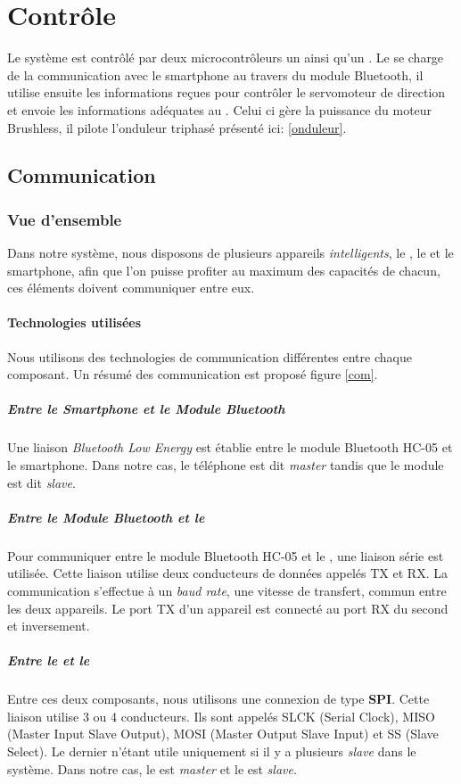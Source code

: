 	\chapter{Contrôle}
	Le système est contrôlé par deux microcontrôleurs un \pic ainsi qu'un \dspic. Le \pic se charge de la communication avec le smartphone au travers du module Bluetooth, il utilise ensuite les informations reçues pour contrôler le servomoteur de direction et envoie les informations adéquates au \dspic. Celui ci gère la puissance du moteur Brushless, il pilote l'onduleur triphasé présenté ici: \ref{onduleur}.
		\section{Communication}
			\subsection{Vue d'ensemble}
				Dans notre système, nous disposons de plusieurs appareils \textit{intelligents}, le \pic , le \dspic et le smartphone, afin que l'on puisse profiter au maximum des capacités de chacun, ces éléments doivent communiquer entre eux.
				\subsubsection{Technologies utilisées}
				Nous utilisons des technologies de communication différentes entre chaque composant. Un résumé des communication est proposé figure \ref{com}.
				\paragraph{Entre le \textit{Smartphone} et le \textit{Module Bluetooth}} Une liaison \textit{Bluetooth Low Energy} est établie entre le module Bluetooth HC-05 et le smartphone. Dans notre cas, le téléphone est dit \textit{master} tandis que le module est dit \textit{slave}.
				\paragraph{Entre le \textit{Module Bluetooth} et le \textit{\pic} } Pour communiquer entre le module Bluetooth HC-05 et le \pic, une liaison série est utilisée. Cette liaison utilise deux conducteurs de données appelés TX et RX. La communication s'effectue à un \textit{baud rate}, une vitesse de transfert, commun entre les deux appareils. Le port TX d'un appareil est connecté au port RX du second et inversement.
				\paragraph{Entre le \textit{\dspic} et le \textit{\pic}} Entre ces deux composants, nous utilisons une connexion de type \textbf{SPI}. Cette liaison utilise 3 ou 4 conducteurs. Ils sont appelés SLCK (\textsf{Serial Clock}), MISO (\textsf{Master Input Slave Output}), MOSI (\textsf{Master Output Slave Input})  et SS (\textsf{Slave Select}). Le dernier n'étant utile uniquement si il y a plusieurs \textit{slave} dans le système. Dans notre cas, le \pic est \textit{master} et le \dspic est \textit{slave}.
				
